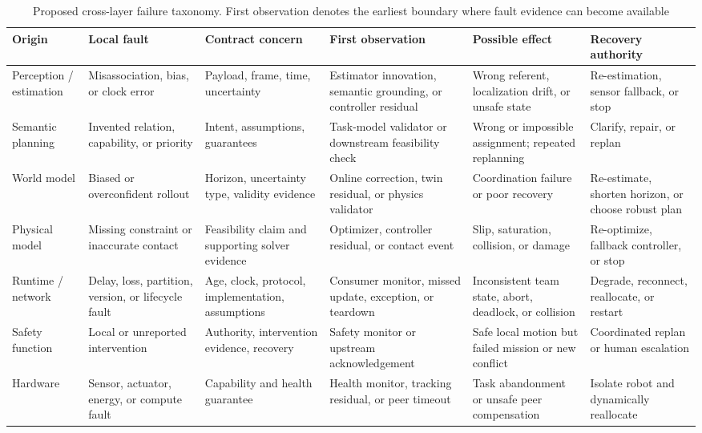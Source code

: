 \begin{table}[!t]
  \centering
  \caption{Proposed cross-layer failure taxonomy.  First observation denotes the earliest boundary where fault evidence can become available}
  \label{tab:failure-propagation}
  \scriptsize
  \begin{tabularx}{\textwidth}{@{}P{0.10\textwidth}P{0.14\textwidth}P{0.14\textwidth}Y P{0.15\textwidth}P{0.14\textwidth}@{}}
    \toprule
    Origin & Local fault & Contract concern & First observation & Possible effect & Recovery authority \\
    \midrule
    Perception / estimation & Misassociation, bias, or clock error & Payload, frame, time, uncertainty & Estimator innovation, semantic grounding, or controller residual & Wrong referent, localization drift, or unsafe state & Re-estimation, sensor fallback, or stop \\
    Semantic planning & Invented relation, capability, or priority & Intent, assumptions, guarantees & Task-model validator or downstream feasibility check & Wrong or impossible assignment; repeated replanning & Clarify, repair, or replan \\
    World model & Biased or overconfident rollout & Horizon, uncertainty type, validity evidence & Online correction, twin residual, or physics validator & Coordination failure or poor recovery & Re-estimate, shorten horizon, or choose robust plan \\
    Physical model & Missing constraint or inaccurate contact & Feasibility claim and supporting solver evidence & Optimizer, controller residual, or contact event & Slip, saturation, collision, or damage & Re-optimize, fallback controller, or stop \\
    Runtime / network & Delay, loss, partition, version, or lifecycle fault & Age, clock, protocol, implementation, assumptions & Consumer monitor, missed update, exception, or teardown & Inconsistent team state, abort, deadlock, or collision & Degrade, reconnect, reallocate, or restart \\
    Safety function & Local or unreported intervention & Authority, intervention evidence, recovery & Safety monitor or upstream acknowledgement & Safe local motion but failed mission or new conflict & Coordinated replan or human escalation \\
    Hardware & Sensor, actuator, energy, or compute fault & Capability and health guarantee & Health monitor, tracking residual, or peer timeout & Task abandonment or unsafe peer compensation & Isolate robot and dynamically reallocate \\
    \bottomrule
  \end{tabularx}
\end{table}
